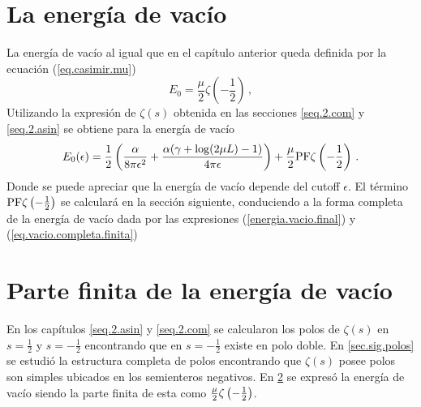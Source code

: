 \begin{comment}
\begin{equation}
\frac{1 }{2 \pi i}
\int _{circulo} \lambda ^{-2s } \partial \lambda \ Ln \left[
					\frac{e ^{\frac{i \alpha  \log ( 2 \lambda L )}{2 \lambda}} e ^{2 i \lambda L} S1}
					{\Gamma \left( 1 - \frac{i \alpha}{2 \lambda} \right)} - 
					\frac{e ^{\frac{-i \alpha  \log (2 \lambda L )}{2 \lambda}} S2}
					{\Gamma \left( 1 + \frac{i \alpha}{2 \lambda} \right)}					
					\right] d \lambda
\end{equation}
\end{comment}

\section{La energía de vacío}\label{sec.parte.finita.vacio}

La energía de vacío al igual que en el capítulo anterior queda definida por la ecuación (\ref{eq.casimir.mu})
\begin{equation}
\nonumber
    E _0 = \frac{\mu }{2}  
    \zeta  \left( - \frac{1}{2} \right) 
	\, ,
\end{equation}
Utilizando la expresión de $\zeta  (s )$ obtenida en las secciones \ref{seq.2.com} y \ref{seq.2.asin} se obtiene para la energía de vacío
\begin{equation}\label{eq.casimir.resultado}
E _0 ( \epsilon ) = \frac{1}{2} \left(
				\frac{\alpha}{8 \pi  \epsilon ^ 2}  + 
				\frac{\alpha ( \gamma  +  \log (2\mu L ) -1 )}{4 \pi  \epsilon}
				\right) + 
				\frac{\mu}{2} {\rm PF } \zeta \left( - \frac{1}{2} \right)
\, .
\end{equation}
Donde se puede apreciar que la energía de vacío depende del cutoff $\epsilon$. El término ${\rm PF } \zeta \left( - \frac{1}{2} \right)$ se calculará en la sección siguiente, conduciendo a la forma completa de la energía de vacío dada por las expresiones  (\ref{energia.vacio.final}) y (\ref{eq.vacio.completa.finita})


\section{Parte finita de la energía de vacío}
\label{sec.regular}

En los capítulos \ref{seq.2.asin} y \ref{seq.2.com} se calcularon los polos de \mbox{$\zeta (s)$} en $s= \frac{1}{2}$ y $s=-\frac{1}{2}$ encontrando que en $s=- \frac{1}{2}$ existe en polo doble. En \ref{sec.sig.polos} se estudió la estructura completa de polos encontrando que $\zeta (s)$ posee polos son simples ubicados en los semienteros negativos. En \ref{sec.regular} se expresó la energía de vacío siendo la parte finita de esta como $\frac{\mu}{2} {\rm} \zeta \left( - \frac{1}{2} \right)$.

